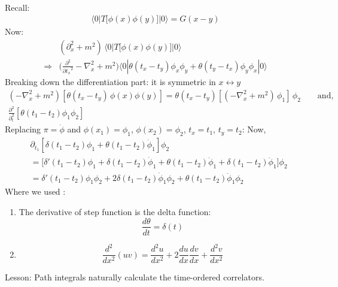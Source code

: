 \documentclass[14pt]{article} %
\begin{document}
{\begin{align*}
\end{align*}
Recall:
\begin{align*}
\langle 0 | T \big[ \phi(x) \phi(y) \big] | 0 \rangle = G(x-y)
\end{align*}
Now:
\begin{align*}
& (\partial_x^2 + m^2) \, \langle 0 | T \big[ \phi(x) \phi(y) \big] | 0 \rangle
\\
\Rightarrow & \big( \frac{\partial^2}{\partial {t_x}^{2}} -\nabla_x^2 + m^2 \big) \langle 0 |\theta (t_x - t_y ) \phi_x \phi_y + \theta (t_y - t_x ) \phi_y \phi_x | 0 \rangle
\end{align*}
Breaking down the differentiation part: it is symmetric in $x \leftrightarrow y$
\begin{align*}
(-\nabla_x ^2 + m^2) [\theta (t_x - t_y) \, \phi(x) \phi(y)] =\theta (t_x - t_y)[(-\nabla_x ^2 + m^2)\,\phi_1]\, \phi_2 \qquad \text{and}, \\
\frac{\partial^2}{\partial_t ^2} [ \theta(t_1 -t_2) \phi_1 \phi_2 ]
\end{align*}
Replacing $\pi = \dot{\phi}$ and $\phi(x_1) = \phi_1$, $\phi(x_2) = \phi_2$, $t_x = t_1$, $t_y = t_2$:
Now,
\begin{align*}
&\partial_{t_1} \left[ \delta(t_1 - t_2) \phi_1 + \theta(t_1 - t_2) \dot{\phi}_1 \right] \phi_2 \\
&= \big[ \delta'(t_1 - t_2) \phi_1 + \delta(t_1 - t_2) \dot{\phi}_1 + \theta(t_1 - t_2) \ddot{\phi}_1 + \delta (t_1 - t_2) \ddot{\phi}_1 \big] \phi_2
\\ 
&= \delta'(t_1 - t_2) \phi_1 \phi_2 + 2\delta(t_1 - t_2) \dot{\phi}_1 \phi_2 + \theta(t_1 - t_2) \ddot{\phi}_1 \phi_2
\end{align*}
Where we used :
\begin{enumerate}
\item The derivative of step function is the delta function:
\[
\frac{d \theta}{dt} = \delta(t)
\]
\item 
\[
\frac{d^2}{dx^2}(uv) = \frac{d^2u}{dx^2} +2 \frac{du}{dx}\frac{dv}{dx} + \frac{d^2 v}{dx^2} 
\]
\end{enumerate}
Lesson: Path integrals naturally calculate the time-ordered correlators.  

}
\end{document}
